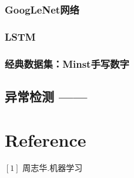 \documentclass{article}
\begin{document}
\subsubsection{GoogLeNet网络}
\subsubsection{LSTM}
\subsubsection{经典数据集：Minst手写数字}

\subsection{异常检测 —— }



\section{Reference}
$[1]$ 周志华.机器学习
\end{document}
